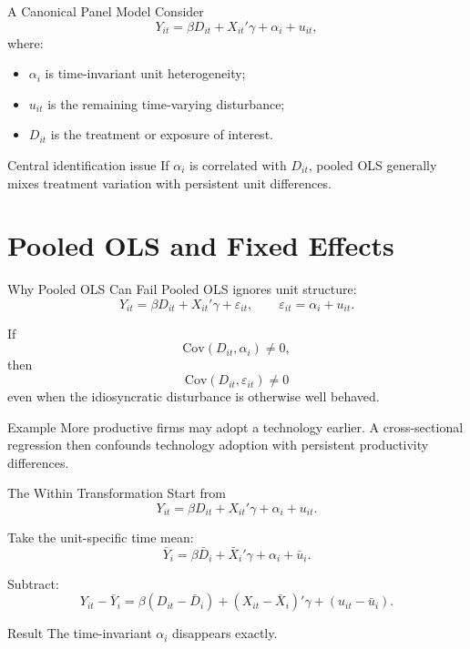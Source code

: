 \documentclass[aspectratio=169,11pt]{beamer}
\newcommand{\Cov}{\mathrm{Cov}}
\begin{document}
\begin{frame}{A Canonical Panel Model}
Consider
\[
Y_{it}=\beta D_{it}+X_{it}'\gamma+\alpha_i+u_{it},
\]
where:
\begin{itemize}
\item \(\alpha_i\) is time-invariant unit heterogeneity;
\item \(u_{it}\) is the remaining time-varying disturbance;
\item \(D_{it}\) is the treatment or exposure of interest.
\end{itemize}

\begin{alertblock}{Central identification issue}
If \(\alpha_i\) is correlated with \(D_{it}\), pooled OLS generally mixes treatment variation with persistent unit differences.
\end{alertblock}
\end{frame}

\section{Pooled OLS and Fixed Effects}

\begin{frame}{Why Pooled OLS Can Fail}
Pooled OLS ignores unit structure:
\[
Y_{it}=\beta D_{it}+X_{it}'\gamma+\varepsilon_{it},
\qquad
\varepsilon_{it}=\alpha_i+u_{it}.
\]

If
\[
\Cov(D_{it},\alpha_i)\neq 0,
\]
then
\[
\Cov(D_{it},\varepsilon_{it})\neq 0
\]
even when the idiosyncratic disturbance is otherwise well behaved.

\begin{block}{Example}
More productive firms may adopt a technology earlier. A cross-sectional regression then confounds technology adoption with persistent productivity differences.
\end{block}
\end{frame}

\begin{frame}{The Within Transformation}
Start from
\[
Y_{it}=\beta D_{it}+X_{it}'\gamma+\alpha_i+u_{it}.
\]

Take the unit-specific time mean:
\[
\bar Y_i=\beta \bar D_i+\bar X_i'\gamma+\alpha_i+\bar u_i.
\]

Subtract:
\[
Y_{it}-\bar Y_i
=
\beta(D_{it}-\bar D_i)
+
(X_{it}-\bar X_i)'\gamma
+
(u_{it}-\bar u_i).
\]

\begin{alertblock}{Result}
The time-invariant \(\alpha_i\) disappears exactly.
\end{alertblock}
\end{frame}
\end{document}
